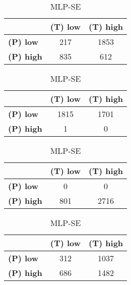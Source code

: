 \begin{landscape}
\begin{table}[htbp]
\begin{minipage}{.3\textwidth}
\begin{tabular}{|l|c|c|}
\hline
					& \textbf{(T) low}	& \textbf{(T) high}	\\ \hline
\textbf{(P) low}	& 217				& 1853				\\ \hline
\textbf{(P) high}	& 835				& 612				\\ \hline
\end{tabular}
\end{minipage}\hfill
\begin{minipage}{.3\textwidth}
\tiny
\caption*{MLP-AT}
\begin{tabular}{|l|c|c|}
\hline
					& \textbf{(T) low}	& \textbf{(T) high}	\\ \hline
\textbf{(P) low}	& 1815				& 1701				\\ \hline
\textbf{(P) high}	& 1					& 0					\\ \hline
\end{tabular}
\end{minipage}\hfill
\begin{minipage}{.3\textwidth}
\tiny
\caption*{MLP-PL}
\begin{tabular}{|l|c|c|}
\hline
					& \textbf{(T) low}	& \textbf{(T) high}	\\ \hline
\textbf{(P) low}	& 0					& 0					\\ \hline
\textbf{(P) high}	& 801				& 2716				\\ \hline
\end{tabular}
\end{minipage}\hfill
\begin{minipage}{.3\textwidth}
\tiny
\caption*{MLP-SE}
\begin{tabular}{|l|c|c|}
\hline
					& \textbf{(T) low}	& \textbf{(T) high}	\\ \hline
\textbf{(P) low}	& 312				& 1037				\\ \hline
\textbf{(P) high}	& 686				& 1482				\\ \hline
\end{tabular}
\end{minipage}\hfill
\end{table}
\end{landscape}